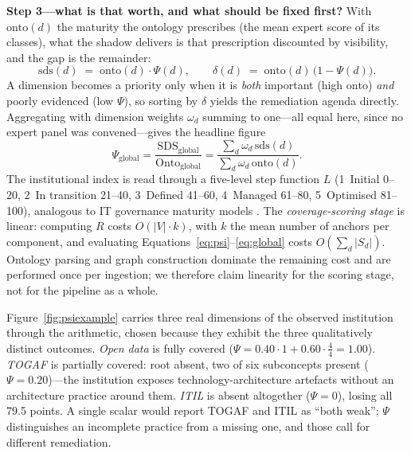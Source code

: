 \documentclass[engproc,proceedingpaper,submit,moreauthors]{Definitions/mdpi}
\begin{document}
\textbf{Step 3---what is that worth, and what should be fixed first?} With $\mathrm{onto}(d)$ the maturity the ontology prescribes (the mean expert score of its classes), what the shadow delivers is that prescription discounted by visibility, and the gap is the remainder:
\begin{equation}
\mathrm{sds}(d) \;=\; \mathrm{onto}(d)\cdot\Psi(d),
\qquad
\delta(d) \;=\; \mathrm{onto}(d)\,\bigl(1-\Psi(d)\bigr).
\label{eq:delta}
\end{equation}
A dimension becomes a priority only when it is \emph{both} important (high $\mathrm{onto}$) \emph{and} poorly evidenced (low $\Psi$), so sorting by $\delta$ yields the remediation agenda directly. Aggregating with dimension weights $\omega_d$ summing to one---all equal here, since no expert panel was convened---gives the headline figure
\begin{equation}
\Psi_{\mathrm{global}}=\frac{\mathrm{SDS}_{\mathrm{global}}}{\mathrm{Onto}_{\mathrm{global}}}=\frac{\sum_d \omega_d\,\mathrm{sds}(d)}{\sum_d \omega_d\,\mathrm{onto}(d)}.
\label{eq:global}
\end{equation} The institutional index is read through a five-level step function $L$ (1~Initial 0--20, 2~In transition 21--40, 3~Defined 41--60, 4~Managed 61--80, 5~Optimised 81--100), analogous to IT governance maturity models \cite{DeHaes2013}. The \emph{coverage-scoring stage} is linear: computing $R$ costs $O(|V|\cdot k)$, with $k$ the mean number of anchors per component, and evaluating Equations~\eqref{eq:psi}--\eqref{eq:global} costs $O(\sum_d|S_d|)$. Ontology parsing and graph construction dominate the remaining cost and are performed once per ingestion; we therefore claim linearity for the scoring stage, not for the pipeline as a whole.

Figure~\ref{fig:psiexample} carries three real dimensions of the observed institution through the arithmetic, chosen because they exhibit the three qualitatively distinct outcomes. \emph{Open data} is fully covered ($\Psi=0.40\cdot 1+0.60\cdot\frac{4}{4}=1.00$). \emph{TOGAF} is partially covered: root absent, two of six subconcepts present ($\Psi=0.20$)---the institution exposes technology-architecture artefacts without an architecture practice around them. \emph{ITIL} is absent altogether ($\Psi=0$), losing all 79.5 points. A single scalar would report TOGAF and ITIL as ``both weak''; $\Psi$ distinguishes an incomplete practice from a missing one, and those call for different remediation.
\end{document}
